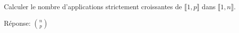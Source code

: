 \begin{exercice}
    Calculer le nombre d'applications strictement croissantes de $\llbracket 1, p \rrbracket$ dans $\llbracket 1, n \rrbracket$.
\end{exercice}

\begin{elem_sol}
    Réponse: $\displaystyle \binom{n}{p}$
\end{elem_sol}